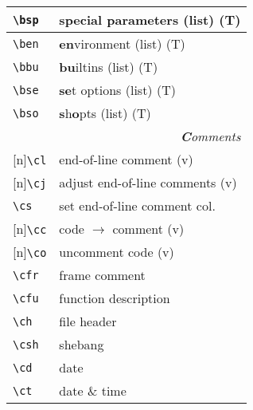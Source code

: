 \documentclass[oneside,11pt,landscape,DIV16]{scrartcl}
\newcommand{\Rep}{{\scriptsize{[n]}}}
\begin{document}
\begin{multicols}{3}
\begin{center}
\begin{tabular}[]{|p{11mm}|p{60mm}|}
\hline \verb'\bsp'   & \textbf{s}pecial \textbf{p}arameters (list)     \hfill (T)\\
\hline \verb'\ben'   & \textbf{en}vironment (list)                     \hfill (T)\\
\hline \verb'\bbu'   & \textbf{bu}iltins (list)                        \hfill (T)\\
\hline \verb'\bse'   & \textbf{se}t options (list)                     \hfill (T)\\
\hline \verb'\bso'   & \textbf{s}h\textbf{o}pts (list)                 \hfill (T)\\
\hline 
\hline
\multicolumn{2}{|r|}{\textsl{\textbf{C}omments}}                       \\[1.0ex]
\hline \Rep\verb'\cl'   & end-of-line comment               \hfill (v)\\
\hline \Rep\verb'\cj'   & adjust end-of-line comments       \hfill (v)\\
\hline     \verb'\cs'   & set end-of-line comment col.      \\
%
\hline \Rep\verb'\cc'   & code $\rightarrow$ comment        \hfill (v)\\
\hline \Rep\verb'\co'   & uncomment code                    \hfill (v)\\
%
\hline     \verb'\cfr'  & frame comment                     \\
\hline     \verb'\cfu'  & function description              \\
\hline     \verb'\ch'   & file header                       \\
\hline     \verb'\csh'  & shebang                           \\
\hline     \verb'\cd'   & date                              \\
\hline     \verb'\ct'   & date \& time                      \\
\hline
\end{tabular}\\
%
\begin{tabular}[]{|p{11mm}|p{60mm}|}

\end{tabular}
\end{center}
\end{multicols}
\end{document}
